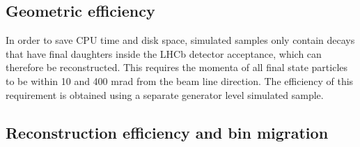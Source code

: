 


\subsection{Geometric efficiency}


In order to save CPU time and disk space, simulated samples only contain decays that have
 final daughters inside the LHCb detector acceptance, which can therefore be reconstructed. 
This requires the momenta of all final state particles to be within 10 and 400 mrad 
from the beam line direction. The efficiency of this requirement is obtained using a separate
generator level simulated sample.

\subsection{Reconstruction efficiency and bin migration}
\label{sec:reco_binmig}

